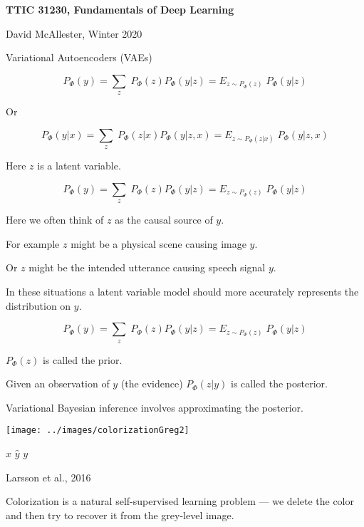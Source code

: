 





{\Huge

  \centerline{\bf TTIC 31230, Fundamentals of Deep Learning}
  \bigskip
  \centerline{David McAllester, Winter 2020}
  \vfill
  \vfil
  \centerline{Variational Autoencoders (VAEs)}
  \vfill
  \vfill


{\color{red} $$P_\Phi(y) = \sum_z\;P_\Phi(z)P_\Phi(y|z) = E_{z \sim P_\Phi(z)}\;P_\Phi(y|z)$$}

Or

\vfill
{\color{red} $$P_\Phi(y|x) = \sum_z\;P_\Phi(z|x)P_\Phi(y|z,x) = E_{z \sim P_\Phi(z|x)}\;P_\Phi(y|z,x)$$}

\vfill
Here {\color{red} $z$} is a latent variable.


{\color{red} $$P_\Phi(y) = \sum_z\;P_\Phi(z)P_\Phi(y|z) = E_{z \sim P_\Phi(z)}\;P_\Phi(y|z)$$}

Here we often think of $z$ as the causal source of $y$.

\vfill
For example $z$ might be a physical scene causing image $y$.

\vfill
Or $z$ might be the intended utterance causing speech signal $y$.

\vfill
In these situations a latent variable model should more accurately represents the distribution on $y$.


{\color{red} $$P_\Phi(y) = \sum_z\;P_\Phi(z)P_\Phi(y|z) = E_{z \sim P_\Phi(z)}\;P_\Phi(y|z)$$}

\vfill
$P_\Phi(z)$ is called the prior.

\vfill
Given an observation of $y$ (the evidence) $P_\Phi(z|y)$ is called the posterior.

\vfill
Variational Bayesian inference involves approximating the posterior.

\medskip
\centerline{\texttt{[image: ../images/colorizationGreg2]}}
\centerline{$x$ \hspace{4em} $\hat{y}$ \hspace{4em} $y$}
\centerline{\huge Larsson et al., 2016}

\vfill
Colorization is a natural self-supervised learning problem --- we delete the color and then try to recover it from the grey-level image.

}
